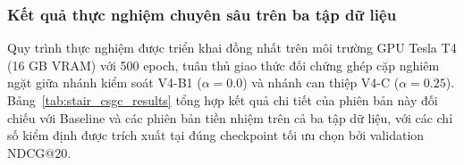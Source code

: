 \subsubsection{Kết quả thực nghiệm chuyên sâu trên ba tập dữ liệu}

Quy trình thực nghiệm được triển khai đồng nhất trên môi trường GPU Tesla T4 (16 GB VRAM) với 500 epoch, tuân thủ giao thức đối chứng ghép cặp nghiêm ngặt giữa nhánh kiểm soát V4-B1 ($\alpha=0.0$) và nhánh can thiệp V4-C ($\alpha=0.25$). Bảng~\ref{tab:stair_csgc_results} tổng hợp kết quả chi tiết của phiên bản này đối chiếu với Baseline và các phiên bản tiền nhiệm trên cả ba tập dữ liệu, với các chỉ số kiểm định được trích xuất tại đúng checkpoint tối ưu chọn bởi validation NDCG@20.

\renewcommand{\arraystretch}{1.15}
\begingroup
\footnotesize
\setlength{\tabcolsep}{3.5pt}
